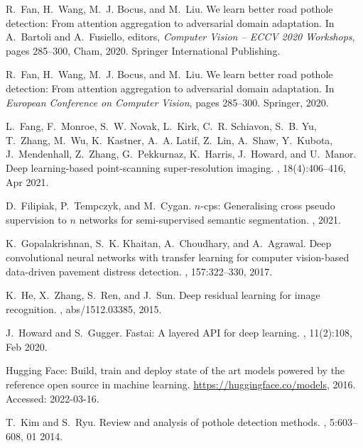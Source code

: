 \documentclass[twocolumn]{article}
\begin{document}
\begin{thebibliography}{10}
R.~Fan, H.~Wang, M.~J. Bocus, and M.~Liu.
\newblock We learn better road pothole detection: From attention aggregation to
  adversarial domain adaptation.
\newblock In A.~Bartoli and A.~Fusiello, editors, {\em Computer Vision -- ECCV
  2020 Workshops}, pages 285--300, Cham, 2020. Springer International
  Publishing.

R.~Fan, H.~Wang, M.~J. Bocus, and M.~Liu.
\newblock We learn better road pothole detection: From attention aggregation to
  adversarial domain adaptation.
\newblock In {\em European Conference on Computer Vision}, pages 285--300.
  Springer, 2020.

L.~Fang, F.~Monroe, S.~W. Novak, L.~Kirk, C.~R. Schiavon, S.~B. Yu, T.~Zhang,
  M.~Wu, K.~Kastner, A.~A. Latif, Z.~Lin, A.~Shaw, Y.~Kubota, J.~Mendenhall,
  Z.~Zhang, G.~Pekkurnaz, K.~Harris, J.~Howard, and U.~Manor.
\newblock Deep learning-based point-scanning super-resolution imaging.
, 18(4):406--416, Apr 2021.

D.~Filipiak, P.~Tempczyk, and M.~Cygan.
\newblock $ n $-cps: Generalising cross pseudo supervision to $ n $ networks
  for semi-supervised semantic segmentation.
, 2021.

K.~Gopalakrishnan, S.~K. Khaitan, A.~Choudhary, and A.~Agrawal.
\newblock Deep convolutional neural networks with transfer learning for
  computer vision-based data-driven pavement distress detection.
, 157:322--330, 2017.

K.~He, X.~Zhang, S.~Ren, and J.~Sun.
\newblock Deep residual learning for image recognition.
, abs/1512.03385, 2015.

J.~Howard and S.~Gugger.
\newblock Fastai: {A} layered {API} for deep learning.
, 11(2):108, Feb 2020.

{Hugging Face}: Build, train and deploy state of the art models powered by the
  reference open source in machine learning.
\newblock \url{https://huggingface.co/models}, 2016.
\newblock Accessed: 2022-03-16.

T.~Kim and S.~Ryu.
\newblock Review and analysis of pothole detection methods.
, 5:603--608, 01 2014.


\end{thebibliography}
\end{document}
